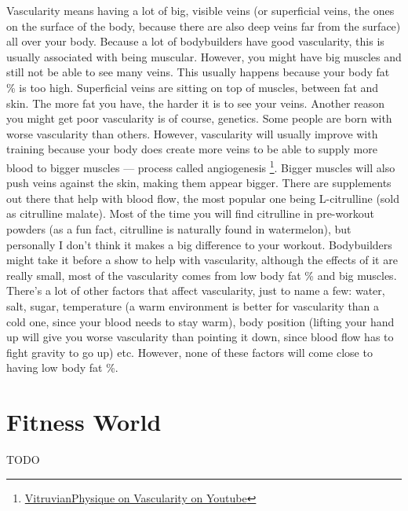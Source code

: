 \documentclass[openany, 12pt]{book}
\begin{document}
        Vascularity means having a lot of big, visible veins (or superficial veins, the ones on the surface of the body, because there are also deep veins far from the surface) all over your body.
        Because a lot of bodybuilders have good vascularity, this is usually associated with being muscular. However, you might have big muscles and still not be able to see many veins. This usually
        happens because your body fat \% is too high. Superficial veins are sitting on top of muscles, between fat and skin. The more fat you have, the harder it is to see your veins.
        Another reason you might get poor vascularity is of course, genetics. Some people are born with worse vascularity than others. However, vascularity will usually improve with training
        because your body does create more veins to be able to supply more blood to bigger muscles --- process called angiogenesis
        \footnote{\href{https://www.youtube.com/watch?v=N1oCJiw8oTY}{VitruvianPhysique on Vascularity on Youtube}}. Bigger muscles will also push veins against the skin, making them appear bigger.
        There are supplements out there that help with blood flow, the most popular one being L-citrulline (sold as citrulline malate). Most of the time you will find citrulline in pre-workout
        powders (as a fun fact, citrulline is naturally found in watermelon), but personally I don't think it makes a big difference to your workout. Bodybuilders might take it before a show
        to help with vascularity, although the effects of it are really small, most of the vascularity comes from low body fat \% and big muscles.
        There's a lot of other factors that affect vascularity, just to name a few:
        water, salt, sugar, temperature (a warm environment is better for vascularity than a cold one, since your blood needs to stay warm), body position (lifting your hand up will give you worse
        vascularity than pointing it down, since blood flow has to fight gravity to go up) etc. However, none of these factors will come close to having low body fat \%.

  \chapter{Fitness World}

	TODO

  
\end{document}
